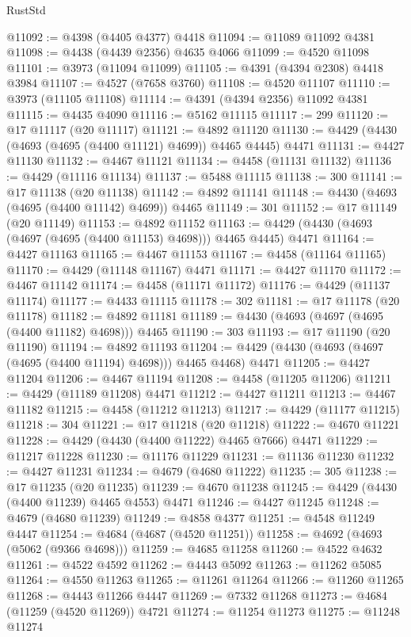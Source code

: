 \begin{lexlean}{RustStd}
\begin{coremodule}
@11092 := @4398 (@4405 @4377) @4418
@11094 := @11089 @11092 @4381
@11098 := @4438 (@4439 @2356) @4635 @4066
@11099 := @4520 @11098
@11101 := @3973 (@11094 @11099)
@11105 := @4391 (@4394 @2308) @4418 @3984
@11107 := @4527 (@7658 @3760)
@11108 := @4520 @11107
@11110 := @3973 (@11105 @11108)
@11114 := @4391 (@4394 @2356) @11092 @4381
@11115 := @4435 @4090
@11116 := @5162 @11115
@11117 := 299
@11120 := @17 @11117 (@20 @11117)
@11121 := @4892 @11120
@11130 := @4429 (@4430 (@4693 (@4695 (@4400 @11121) @4699)) @4465 @4445) @4471
@11131 := @4427 @11130
@11132 := @4467 @11121
@11134 := @4458 (@11131 @11132)
@11136 := @4429 (@11116 @11134)
@11137 := @5488 @11115
@11138 := 300
@11141 := @17 @11138 (@20 @11138)
@11142 := @4892 @11141
@11148 := @4430 (@4693 (@4695 (@4400 @11142) @4699)) @4465
@11149 := 301
@11152 := @17 @11149 (@20 @11149)
@11153 := @4892 @11152
@11163 := @4429 (@4430 (@4693 (@4697 (@4695 (@4400 @11153) @4698))) @4465 @4445) @4471
@11164 := @4427 @11163
@11165 := @4467 @11153
@11167 := @4458 (@11164 @11165)
@11170 := @4429 (@11148 @11167) @4471
@11171 := @4427 @11170
@11172 := @4467 @11142
@11174 := @4458 (@11171 @11172)
@11176 := @4429 (@11137 @11174)
@11177 := @4433 @11115
@11178 := 302
@11181 := @17 @11178 (@20 @11178)
@11182 := @4892 @11181
@11189 := @4430 (@4693 (@4697 (@4695 (@4400 @11182) @4698))) @4465
@11190 := 303
@11193 := @17 @11190 (@20 @11190)
@11194 := @4892 @11193
@11204 := @4429 (@4430 (@4693 (@4697 (@4695 (@4400 @11194) @4698))) @4465 @4468) @4471
@11205 := @4427 @11204
@11206 := @4467 @11194
@11208 := @4458 (@11205 @11206)
@11211 := @4429 (@11189 @11208) @4471
@11212 := @4427 @11211
@11213 := @4467 @11182
@11215 := @4458 (@11212 @11213)
@11217 := @4429 (@11177 @11215)
@11218 := 304
@11221 := @17 @11218 (@20 @11218)
@11222 := @4670 @11221
@11228 := @4429 (@4430 (@4400 @11222) @4465 @7666) @4471
@11229 := @11217 @11228
@11230 := @11176 @11229
@11231 := @11136 @11230
@11232 := @4427 @11231
@11234 := @4679 (@4680 @11222)
@11235 := 305
@11238 := @17 @11235 (@20 @11235)
@11239 := @4670 @11238
@11245 := @4429 (@4430 (@4400 @11239) @4465 @4553) @4471
@11246 := @4427 @11245
@11248 := @4679 (@4680 @11239)
@11249 := @4858 @4377
@11251 := @4548 @11249 @4447
@11254 := @4684 (@4687 (@4520 @11251))
@11258 := @4692 (@4693 (@5062 (@9366 @4698)))
@11259 := @4685 @11258
@11260 := @4522 @4632
@11261 := @4522 @4592
@11262 := @4443 @5092
@11263 := @11262 @5085
@11264 := @4550 @11263
@11265 := @11261 @11264
@11266 := @11260 @11265
@11268 := @4443 @11266 @4447
@11269 := @7332 @11268
@11273 := @4684 (@11259 (@4520 @11269)) @4721
@11274 := @11254 @11273
@11275 := @11248 @11274

\end{coremodule}
\end{lexlean}
